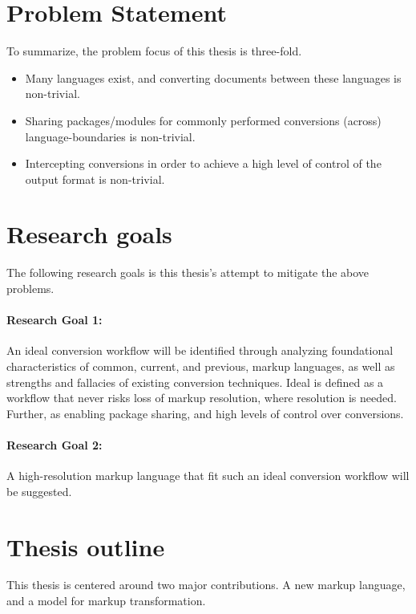 \documentclass{scrreprt}
\begin{document}
\color{black}



\section{Problem Statement}
To summarize, the problem focus of this thesis is three-fold.

\begin{itemize}
\item Many languages exist, and converting documents between these languages is non-trivial.
\item Sharing packages/modules for commonly performed conversions (across) language-boundaries is non-trivial.
\item Intercepting conversions in order to achieve a high level of control of the output format is non-trivial.
\end{itemize}




\section{Research goals}
The following research goals is this thesis's attempt to mitigate the above problems.

\paragraph{Research Goal 1:} An ideal conversion workflow will be identified through analyzing foundational characteristics of common, current, and previous, markup languages, as well as strengths and fallacies of existing conversion techniques. Ideal is defined as a workflow that never risks loss of markup resolution, where resolution is needed. Further, as enabling package sharing, and high levels of control over conversions.

\paragraph{Research Goal 2:} A high-resolution markup language that fit such an ideal conversion workflow will be suggested.








\section{Thesis outline}
This thesis is centered around two major contributions. A new markup language, and a model for markup transformation.
\end{document}
